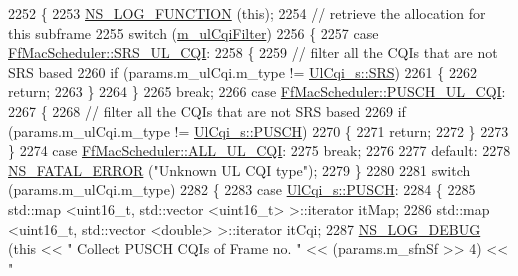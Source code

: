 \begin{DoxyCode}
2252 \{
2253   \hyperlink{log-macros-disabled_8h_a90b90d5bad1f39cb1b64923ea94c0761}{NS\_LOG\_FUNCTION} (\textcolor{keyword}{this});
2254 \textcolor{comment}{// retrieve the allocation for this subframe}
2255   \textcolor{keywordflow}{switch} (\hyperlink{classns3_1_1FfMacScheduler_adae16e66a1c4231da80a1221297442cf}{m\_ulCqiFilter})
2256     \{
2257     \textcolor{keywordflow}{case} \hyperlink{classns3_1_1FfMacScheduler_aa47a9eb25f2c558c825b0be645304a52af2e0df473ba2c8f9cb131cb760591aed}{FfMacScheduler::SRS\_UL\_CQI}:
2258       \{
2259         \textcolor{comment}{// filter all the CQIs that are not SRS based}
2260         \textcolor{keywordflow}{if} (params.m\_ulCqi.m\_type != \hyperlink{structns3_1_1UlCqi__s_aece9e5ebea42eb9ff1744c72c8459b57af4b6dba4243636562c910c4d4761dd7e}{UlCqi\_s::SRS})
2261           \{
2262             \textcolor{keywordflow}{return};
2263           \}
2264       \}
2265       \textcolor{keywordflow}{break};
2266     \textcolor{keywordflow}{case} \hyperlink{classns3_1_1FfMacScheduler_aa47a9eb25f2c558c825b0be645304a52a4a833bc779439b15bd904e1dd8eaa563}{FfMacScheduler::PUSCH\_UL\_CQI}:
2267       \{
2268         \textcolor{comment}{// filter all the CQIs that are not SRS based}
2269         \textcolor{keywordflow}{if} (params.m\_ulCqi.m\_type != \hyperlink{structns3_1_1UlCqi__s_aece9e5ebea42eb9ff1744c72c8459b57a9716b20a3095c473ae3fde1eb5d0bb63}{UlCqi\_s::PUSCH})
2270           \{
2271             \textcolor{keywordflow}{return};
2272           \}
2273       \}
2274     \textcolor{keywordflow}{case} \hyperlink{classns3_1_1FfMacScheduler_aa47a9eb25f2c558c825b0be645304a52a84059a597c72335f0a5963c3efcbda71}{FfMacScheduler::ALL\_UL\_CQI}:
2275       \textcolor{keywordflow}{break};
2276 
2277     \textcolor{keywordflow}{default}:
2278       \hyperlink{group__fatal_ga5131d5e3f75d7d4cbfd706ac456fdc85}{NS\_FATAL\_ERROR} (\textcolor{stringliteral}{"Unknown UL CQI type"});
2279     \}
2280 
2281   \textcolor{keywordflow}{switch} (params.m\_ulCqi.m\_type)
2282     \{
2283     \textcolor{keywordflow}{case} \hyperlink{structns3_1_1UlCqi__s_aece9e5ebea42eb9ff1744c72c8459b57a9716b20a3095c473ae3fde1eb5d0bb63}{UlCqi\_s::PUSCH}:
2284       \{
2285         std::map <uint16\_t, std::vector <uint16\_t> >::iterator itMap;
2286         std::map <uint16\_t, std::vector <double> >::iterator itCqi;
2287         \hyperlink{group__logging_ga413f1886406d49f59a6a0a89b77b4d0a}{NS\_LOG\_DEBUG} (\textcolor{keyword}{this} << \textcolor{stringliteral}{" Collect PUSCH CQIs of Frame no. "} << (params.m\_sfnSf >> 4) << \textcolor{stringliteral}{"
}
\end{DoxyCode}
